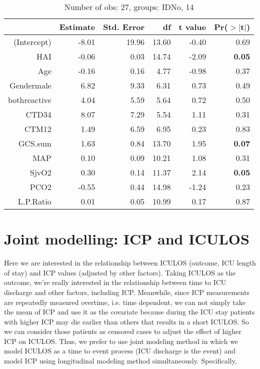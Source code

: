 \documentclass{article}
\begin{document}
\begin{table}[H]
\centering
\caption{Number of obs: 27, groups: IDNo, 14}
\label{tab: lmm4}
\begin{tabular}{rrrrrr}
  \hline
 & Estimate & Std. Error & df & t value & Pr($>$$|$t$|$) \\ 
  \hline
(Intercept) & -8.01 & 19.96 & 13.60 & -0.40 & 0.69 \\ 
  HAI & -0.06 & 0.03 & 14.74 & -2.09 & {\bf 0.05} \\ 
  Age & -0.16 & 0.16 & 4.77 & -0.98 & 0.37 \\ 
  Gendermale & 6.82 & 9.33 & 6.31 & 0.73 & 0.49 \\ 
  bothreactive & 4.04 & 5.59 & 5.64 & 0.72 & 0.50 \\ 
  CTD34 & 8.07 & 7.29 & 5.54 & 1.11 & 0.31 \\ 
  CTM12 & 1.49 & 6.59 & 6.95 & 0.23 & 0.83 \\ 
  GCS.sum & 1.63 & 0.84 & 13.70 & 1.95 & {\bf 0.07} \\ 
  MAP & 0.10 & 0.09 & 10.21 & 1.08 & 0.31 \\ 
  SjvO2 & 0.30 & 0.14 & 11.37 & 2.14 & {\bf 0.05} \\ 
  PCO2 & -0.55 & 0.44 & 14.98 & -1.24 & 0.23 \\ 
  L.P.Ratio & 0.01 & 0.05 & 10.99 & 0.17 & 0.87 \\ 
   \hline
\end{tabular}
\end{table}


\newpage
\section{Joint modelling: ICP and ICULOS}
Here we are interested in the relationship between ICULOS (outcome, ICU length of stay) and ICP values (adjusted by other factors). Taking ICULOS as the outcome, we're really interested in the relationship between time to ICU discharge and other factors, including ICP. Meanwhile, since ICP measurements are repeatedly measured overtime, i.e. time dependent, we can not simply take the mean of ICP and use it as the covariate because during the ICU stay patients with higher ICP may die earlier than others that results in a short ICULOS. So we can consider those patients as censored cases to adjust the effect of higher ICP on ICULOS. Thus, we prefer to use joint modeling method \cite{henderson2000joint} in which we model ICULOS as a time to event process (ICU discharge is the event) and model ICP using longitudinal modeling method simultaneously. Specifically, 
\end{document}
